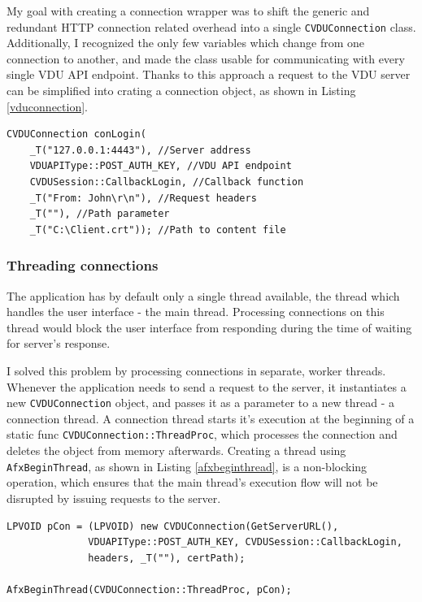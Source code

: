 My goal with creating a connection wrapper was to shift the generic and redundant HTTP connection related overhead into a single \lstinline{CVDUConnection} class. Additionally, I recognized the only few variables which change from one connection to another, and made the class usable for communicating with every single VDU API endpoint. Thanks to this approach a request to the VDU server can be simplified into crating a connection object, as shown in Listing \ref{vduconnection}.
\begin{lstlisting}[caption={Example of instantiating a VDU connection wrapper class.}, label=vduconnection]
CVDUConnection conLogin(
    _T("127.0.0.1:4443"), //Server address
    VDUAPIType::POST_AUTH_KEY, //VDU API endpoint
    CVDUSession::CallbackLogin, //Callback function
    _T("From: John\r\n"), //Request headers
    _T(""), //Path parameter
    _T("C:\Client.crt")); //Path to content file
\end{lstlisting}
\subsubsection{Threading connections}
The application has by default only a single thread available, the thread which handles the user interface - the main thread. Processing connections on this thread would block the user interface from responding during the time of waiting for server's response.

I solved this problem by processing connections in separate, worker threads. Whenever the application needs to send a request to the server, it instantiates a new \lstinline{CVDUConnection} object, and passes it as a parameter to a new thread - a connection thread. A connection thread starts it's execution at the beginning of a static func \lstinline{CVDUConnection::ThreadProc}, which processes the connection and deletes the object from memory afterwards. Creating a thread using \lstinline{AfxBeginThread}, as shown in Listing \ref{afxbeginthread}, is a non-blocking operation, which ensures that the main thread's execution flow will not be disrupted by issuing requests to the server.
\begin{lstlisting}[caption={Creating a new thread to process a connecton which sends a login request to the server.}, label=afxbeginthread]
LPVOID pCon = (LPVOID) new CVDUConnection(GetServerURL(),
              VDUAPIType::POST_AUTH_KEY, CVDUSession::CallbackLogin,
              headers, _T(""), certPath);

AfxBeginThread(CVDUConnection::ThreadProc, pCon);
\end{lstlisting}
